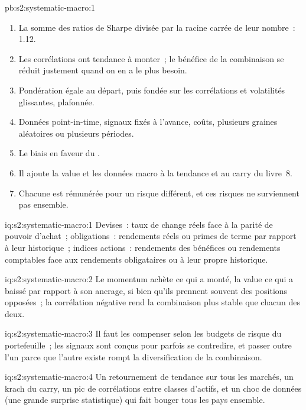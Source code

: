 \begin{solution}{pb:s2:systematic-macro:1}
\begin{enumerate}
que chacun pris isolément~; la value fondée sur les prix est le miroir du momentum (corrélation $-0.43$) et tire la combinaison vers 0.31.
\item La somme des ratios de Sharpe divisée par la racine carrée de leur nombre~: 1.12.
\item Les corrélations ont tendance à monter~; le bénéfice de la combinaison se réduit justement quand on en a le plus besoin.
\item Pondération égale au départ, puis fondée sur les corrélations et volatilités glissantes, plafonnée.
\item Données point-in-time, signaux fixés à l'avance, coûts, plusieurs graines aléatoires ou plusieurs périodes.
\item Le biais en faveur du .
\item Il ajoute la value et les données macro à la tendance et au carry du livre~8.
\item Chacune est rémunérée pour un risque différent, et ces risques ne surviennent pas ensemble.
\end{enumerate}
\end{solution}

\begin{solution}{iq:s2:systematic-macro:1}
Devises~: taux de change réels face à la parité de pouvoir d'achat~; obligations~: rendements réels ou primes de terme par rapport à leur historique~; indices actions~: rendements des bénéfices ou rendements
comptables face aux rendements obligataires ou à leur propre historique.
\end{solution}

\begin{solution}{iq:s2:systematic-macro:2}
Le momentum achète ce qui a monté, la value ce qui a baissé par rapport à son ancrage, si bien qu'ils prennent souvent des positions opposées~; la corrélation négative rend la
combinaison plus stable que chacun des deux.
\end{solution}

\begin{solution}{iq:s2:systematic-macro:3}
Il faut les compenser selon les budgets de risque du portefeuille~; les signaux sont conçus pour parfois se contredire, et passer outre l'un parce que l'autre existe rompt la
diversification de la combinaison.
\end{solution}

\begin{solution}{iq:s2:systematic-macro:4}
Un retournement de tendance sur tous les marchés, un krach du carry, un pic de corrélations entre classes d'actifs, et un choc de données (une grande surprise statistique) qui fait bouger tous
les pays ensemble.
\end{solution}

